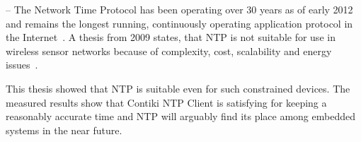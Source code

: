 

--
The Network Time Protocol has been operating over 30 years as of early 2012
and remains the longest running, continuously operating application
protocol in the Internet~\cite{ntp-y2k}.
A thesis from 2009 states, that NTP is
not suitable for use in wireless sensor networks because of complexity, cost,
scalability and energy issues~\cite{thesis-sync}.

This thesis showed that NTP is suitable even for such constrained devices.
The measured results show that Contiki NTP Client is satisfying for keeping a reasonably accurate time
and NTP will arguably find its place among embedded systems in the near future.
